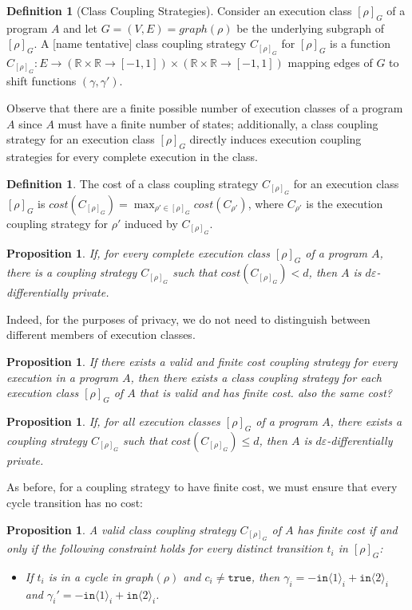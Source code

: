 \documentclass[12pt]{article}
\newcommand{\RR}{\mathbb{R}}
\newcommand{\brangle}[1]{\langle #1 \rangle}
\newtheorem{prop}[thm]{Proposition}
\theoremstyle{definition}
\newtheorem{defn}[thm]{Definition}
\begin{document}
\begin{defn}[Class Coupling Strategies]
    Consider an execution class $[\rho]_G$ of a program $A$ and let $G=(V, E) = graph(\rho)$ be the underlying subgraph of $[\rho]_G$. A [name tentative] class coupling strategy $C_{[\rho]_G}$ for $[\rho]_G$ is a function $C_{[\rho]_G}: E\to (\RR\times\RR\to[-1, 1])\times (\RR\times\RR\to[-1, 1])$ mapping edges of $G$ to shift functions $(\gamma, \gamma')$.
\end{defn}

Observe that there are a finite possible number of execution classes of a program $A$ since $A$ must have a finite number of states; additionally, a class coupling strategy for an execution class $[\rho]_G$ directly induces execution coupling strategies for every complete execution in the class. 

\begin{defn}
    The cost of a class coupling strategy $C_{[\rho]_G}$ for an execution class $[\rho]_G$ is $cost(C_{[\rho]_G}) = \max_{\rho'\in [\rho]_G}cost(C_{\rho'})$, where $C_{\rho'}$ is the execution coupling strategy for $\rho'$ induced by $C_{[\rho]_G}$.
\end{defn}

\begin{prop}
    If, for every complete execution class $[\rho]_G$ of a program $A$, there is a coupling strategy $C_{[\rho]_G}$ such that $cost(C_{[\rho]_G})<d$, then $A$ is $d\varepsilon$-differentially private.
\end{prop}

Indeed, for the purposes of privacy, we do not need to distinguish between different members of execution classes. 

\begin{prop}
    If there exists a valid and finite cost coupling strategy for every execution in a program $A$, then there exists a class coupling strategy for each execution class $[\rho]_G$ of $A$ that is valid and has finite cost. {\color{red} also the same cost?} 
\end{prop}

\begin{prop}
    If, for all execution classes $[\rho]_G$ of a program $A$, there exists a coupling strategy $C_{[\rho]_G}$ such that $cost(C_{[\rho]_G})\leq d$, then $A$ is $d\varepsilon$-differentially private. 
\end{prop}

As before, for a coupling strategy to have finite cost, we must ensure that every cycle transition has no cost:
\begin{prop}
    A valid class coupling strategy $C_{[\rho]_G}$ of $A$ has finite cost if and only if the following constraint holds for every distinct transition $t_i$ in $[\rho]_G$:
    \begin{itemize}
        \item If $t_i$ is in a cycle in $graph(\rho)$ and $c_i\neq\texttt{true}$, then $\gamma_i = -\texttt{in}\brangle{1}_i+\texttt{in}\brangle{2}_i$ and $\gamma_i' = -\texttt{in}\brangle{1}_i+\texttt{in}\brangle{2}_i$.
    \end{itemize}
\end{prop}
\end{document}
